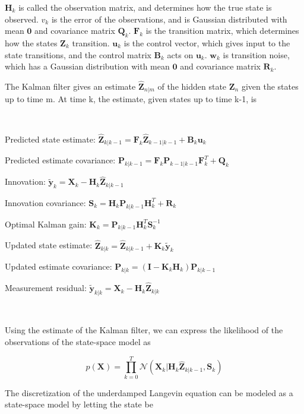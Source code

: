 $\textbf{H}_k$ is called the observation matrix, and determines how the true state is observed. $v_k$ is the error of the observations, and is Gaussian distributed with mean $\textbf{0}$ and covariance matrix $\textbf{Q}_k$. $\textbf{F}_k$ is the transition matrix, which determines how the states $\textbf{Z}_k$ transition. $\textbf{u}_k$ is the control vector, which gives input to the state transitions, and the control matrix $\textbf{B}_k$ acts on $\textbf{u}_k$. $\textbf{w}_k$ is transition noise, which has a Gaussian distribution with mean $\textbf{0}$ and covariance matrix $\textbf{R}_k$.

The Kalman filter gives an estimate $\bm{\hat Z}_{n|m}$ of the hidden state $\textbf{Z}_n$ given the states up to time m. At time k, the estimate, given states up to time k-1, is 

\

Predicted state estimate: $\bm{\hat Z}_{k|k-1} = \textbf{F}_k\bm{\hat Z}_{k-1|k-1} + \textbf{B}_k\textbf{u}_k$

Predicted estimate covariance: $\textbf{P}_{k|k-1} = \textbf{F}_k\textbf{P}_{k-1|k-1} \textbf{F}_k^T + \textbf{Q}_k$

Innovation: $\bm{\tilde y}_{k} = \textbf{X}_k - \textbf{H}_k\bm{\hat Z}_{k|k-1}$

Innovation covariance: $\textbf{S}_k = \textbf{H}_k \textbf{P}_{k|k-1}\textbf{H}_k^T + \textbf{R}_k$

Optimal Kalman gain: $\textbf{K}_k = \textbf{P}_{k|k-1} \textbf{H}_k^T \textbf{S}_k^{-1}$

Updated state estimate: $\bm{\hat Z}_{k|k} = \bm{\hat Z}_{k|k-1} + \textbf{K}_k \bm{\tilde y}_{k}$

Updated estimate covariance: $\textbf{P}_{k|k} = (\textbf{I} - \textbf{K}_k \textbf{H}_k)\textbf{P}_{k|k-1}$

Measurement residual: $\bm{\tilde y}_{k|k} = \textbf{X}_k - \textbf{H}_k \bm{\hat Z}_{k|k}$

\

Using the estimate of the Kalman filter, we can express the likelihood of the observations of the state-space model as 

$$p(\textbf{X}) = \prod_{k=0}^T \mathcal{N}(\textbf{X}_k|\textbf{H}_k\bm{\hat Z}_{k|k-1}, \textbf{S}_k)$$





The discretization of the underdamped Langevin equation can be modeled as a state-space model by letting the state be 

